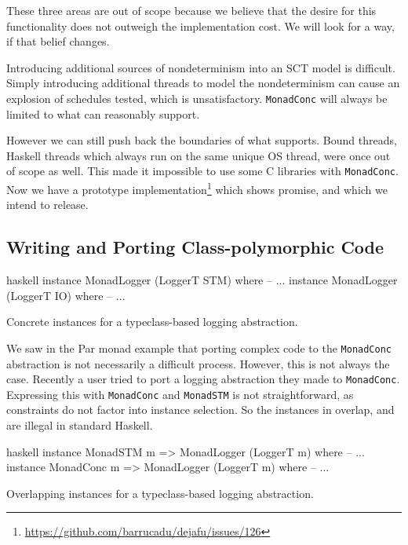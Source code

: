 These three areas are out of scope because we believe that the desire
for this functionality does not outweigh the implementation cost.  We
will look for a way, if that belief changes.

Introducing additional sources of nondeterminism into an SCT model is
difficult.  Simply introducing additional threads to model the
nondeterminism can cause an explosion of schedules tested, which is
unsatisfactory.  \verb|MonadConc| will always be limited to what
\dejafu{} can reasonably support.

However we can still push back the boundaries of what \dejafu{} supports.
Bound threads, Haskell threads which always run on the same unique OS
thread, were once out of scope as well.  This made it impossible to
use some C libraries with \verb|MonadConc|.  Now we have a prototype
implementation\footnote{\url{https://github.com/barrucadu/dejafu/issues/126}}
which shows promise, and which we intend to release.

\subsection{Writing and Porting Class-polymorphic Code}

\begin{listing}
\centering
\begin{cminted}{haskell}
instance MonadLogger (LoggerT STM) where -- ...
instance MonadLogger (LoggerT IO) where -- ...
\end{cminted}
\caption{Concrete instances for a typeclass-based logging abstraction.}\label{lst:mlogger1}
\end{listing}

We saw in the Par monad example that porting complex code to the
\verb|MonadConc| abstraction is not necessarily a difficult process.
However, this is not always the case.  Recently a user tried to port a
logging abstraction they made to \verb|MonadConc|.  Expressing this
with \verb|MonadConc| and \verb|MonadSTM| is not straightforward, as
constraints do not factor into instance selection.  So the instances
in  overlap, and are illegal in standard Haskell.

\begin{listing}
\centering
\begin{cminted}{haskell}
instance MonadSTM  m => MonadLogger (LoggerT m) where -- ...
instance MonadConc m => MonadLogger (LoggerT m) where -- ...
\end{cminted}
\caption{Overlapping instances for a typeclass-based logging abstraction.}\label{lst:mlogger2}
\end{listing}

